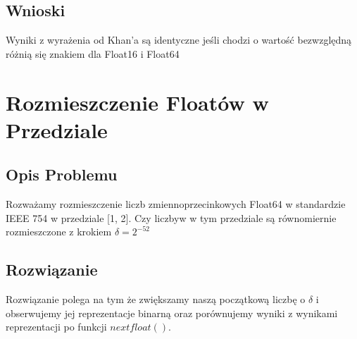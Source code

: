 \documentclass{article}
\begin{document}
\subsection{Wnioski}
    Wyniki z wyrażenia od Khan'a są identyczne jeśli chodzi o wartość bezwzględną różnią się znakiem dla Float16 i Float64
    
\section{Rozmieszczenie Floatów w Przedziale}
\subsection{Opis Problemu}
Rozważamy rozmieszczenie liczb zmiennoprzecinkowych Float64 w standardzie IEEE 754 w przedziale [1, 2]. Czy liczbyw w tym przedziale są równomiernie rozmieszczone z krokiem $\delta=2^{-52}$
\subsection{Rozwiązanie}
    Rozwiązanie polega na tym że zwiększamy naszą początkową liczbę o $\delta$ i obserwujemy jej reprezentacje binarną oraz porównujemy wyniki z wynikami reprezentacji po funkcji $nextfloat()$.
\end{document}

